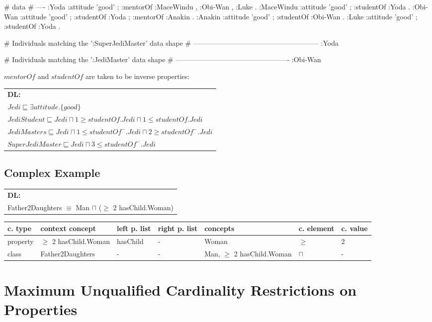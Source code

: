 \documentclass{llncs}
\newenvironment{gcotable}{
  \scriptsize
  \sffamily
  \vspace{0.3cm}
  \begin{tabular}{l|l|l|l|l|l|l}
  \hline
  \textbf{c. type} & \textbf{context concept} & \textbf{left p. list} & \textbf{right p. list} & \textbf{concepts} & \textbf{c. element} & \textbf{c. value} \\
  \hline

}{
  \hline
  \end{tabular}
  \linebreak
}
\newenvironment{DL}{
  \scriptsize
  \sffamily
  \vspace{0.3cm}
  \begin{tabular}{l}
	\textbf{DL:} \\

}{
  \end{tabular}
  \linebreak
}
\newcommand{\tb}[1]{\todo[size=\small, color=blue!40]{\textbf{Thomas:} #1}}
\begin{document}
\begin{ex}
# data
# ----
:Yoda 
    :attitude 'good' ;
    :mentorOf :MaceWindu , :Obi-Wan , :Luke .
:MaceWindu
    :attitude 'good' ;
    :studentOf :Yoda .
:Obi-Wan 
    :attitude 'good' ;
    :studentOf :Yoda ;
    :mentorOf :Anakin .
:Anakin
    :attitude 'good' ; 
    :studentOf :Obi-Wan .
:Luke
    :attitude 'good' ;
    :studentOf :Yoda .
\end{ex}

\begin{ex}
# Individuals matching the ’:SuperJediMaster’ data shape
# ------------------------------------------------------
:Yoda 

# Individuals matching the ’:JediMaster’ data shape
# -------------------------------------------------
:Obi-Wan
\end{ex}

\noindent $mentorOf$ and $studentOf$ are taken to be inverse properties:\\

\begin{DL}
$Jedi \sqsubseteq \exists attitude.\{good\} $\\
$JediStudent \sqsubseteq Jedi \sqcap 1\geq studentOf.Jedi \sqcap 1\leq studentOf.Jedi$ \\
$JediMasters \sqsubseteq Jedi \sqcap 1\leq studentOf^{-}.Jedi\sqcap 2\geq studentOf^{-}.Jedi $\\
$SuperJediMaster \sqsubseteq Jedi \sqcap  3\leq studentOf^{-}.Jedi $
\end{DL}
\subsection{Complex Example}

\begin{DL}
Father2Daughters $\equiv$ Man $\sqcap$ ($\geq$ 2 hasChild.Woman)
\end{DL}


\begin{gcotable}
property & $\geq$ 2 hasChild.Woman & hasChild & - & Woman & $\geq$ & 2 \\
class & Father2Daughters & - & - & Man, $\geq$ 2 hasChild.Woman & $\sqcap$ & - \\
\end{gcotable}

\section{Maximum Unqualified Cardinality Restrictions on Properties}
\end{document}
